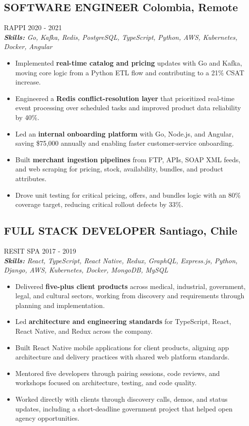 \documentclass{article}
\newcommand{\WorkExperience}[2]{
   \subsection*{#1}
   \vspace{-1em}
   \uppercase{#2}
}
\newcommand{\Skills}[1]{
   \textit{\textbf{Skills:} #1}
}
\begin{document}
\WorkExperience{SOFTWARE ENGINEER \hfill Colombia, Remote}{Rappi \hfill 2020 {-} 2021} \\
\Skills{Go, Kafka, Redis, PostgreSQL, TypeScript, Python, AWS, Kubernetes, Docker, Angular}
\begin{itemize}
\item Implemented \textbf{real-time catalog and pricing} updates with Go and Kafka, moving core logic from a Python ETL flow and contributing to a 21\% CSAT increase.
\item Engineered a \textbf{Redis conflict-resolution layer} that prioritized real-time event processing over scheduled tasks and improved product data reliability by 40\%.
\item Led an \textbf{internal onboarding platform} with Go, Node.js, and Angular, saving \$75,000 annually and enabling faster customer-service onboarding.
\item Built \textbf{merchant ingestion pipelines} from FTP, APIs, SOAP XML feeds, and web scraping for pricing, stock, availability, bundles, and product attributes.
\item Drove unit testing for critical pricing, offers, and bundles logic with an 80\% coverage target, reducing critical rollout defects by 33\%.
\end{itemize}

\WorkExperience{FULL STACK DEVELOPER \hfill Santiago, Chile}{Resit SPA \hfill 2017 {-} 2019} \\
\Skills{React, TypeScript, React Native, Redux, GraphQL, Express.js, Python, Django, AWS, Kubernetes, Docker, MongoDB, MySQL}
\begin{itemize}
\item Delivered \textbf{five-plus client products} across medical, industrial, government, legal, and cultural sectors, working from discovery and requirements through planning and implementation.
\item Led \textbf{architecture and engineering standards} for TypeScript, React, React Native, and Redux across the company.
\item Built React Native mobile applications for client products, aligning app architecture and delivery practices with shared web platform standards.
\item Mentored five developers through pairing sessions, code reviews, and workshops focused on architecture, testing, and code quality.
\item Worked directly with clients through discovery calls, demos, and status updates, including a short-deadline government project that helped open agency opportunities.
\end{itemize}
\end{document}
